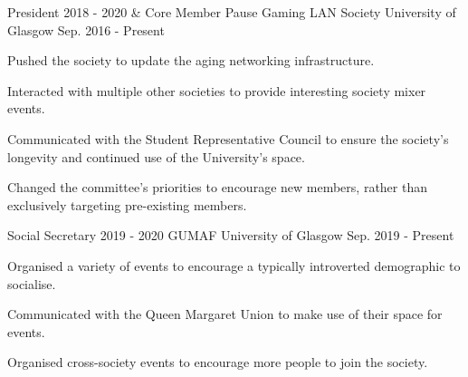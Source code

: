 

\begin{cventries}

    \cventry
    {President 2018 - 2020 \& Core Member} %
    {Pause Gaming LAN Society} %
    {University of Glasgow} %
    {Sep. 2016 - Present} %
    {
        \begin{cvitems} %
            \item Pushed the society to update the aging networking infrastructure.
            \item Interacted with multiple other societies to provide interesting society mixer events.
            \item Communicated with the Student Representative Council to ensure the society's longevity and continued use of the University's space.
            \item Changed the committee's priorities to encourage new members, rather than exclusively targeting pre-existing members.
        \end{cvitems}
    }


    \cventry
    {Social Secretary 2019 - 2020}
    {GUMAF}
    {University of Glasgow}
    {Sep. 2019 - Present}
    {
        \begin{cvitems}
            \item Organised a variety of events to encourage a typically introverted demographic to socialise.
            \item Communicated with the Queen Margaret Union to make use of their space for events.
            \item Organised cross-society events to encourage more people to join the society.
        \end{cvitems}
    }

\end{cventries}
